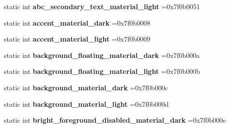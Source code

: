 \begin{DoxyCompactItemize}
static int {\bfseries abc\+\_\+secondary\+\_\+text\+\_\+material\+\_\+light} =0x7f0b0051
\item 
\mbox{\label{classandroid_1_1support_1_1v7_1_1appcompat_1_1R_1_1color_adf9b9dea6fef73b8a1e6ba8df1009171}} 
static int {\bfseries accent\+\_\+material\+\_\+dark} =0x7f0b0008
\item 
\mbox{\label{classandroid_1_1support_1_1v7_1_1appcompat_1_1R_1_1color_a1966f744bfb56259ff2369990a6a06a3}} 
static int {\bfseries accent\+\_\+material\+\_\+light} =0x7f0b0009
\item 
\mbox{\label{classandroid_1_1support_1_1v7_1_1appcompat_1_1R_1_1color_a524c7fb56e9a9e4894f16dafce4544b8}} 
static int {\bfseries background\+\_\+floating\+\_\+material\+\_\+dark} =0x7f0b000a
\item 
\mbox{\label{classandroid_1_1support_1_1v7_1_1appcompat_1_1R_1_1color_a2532ea54ab3e917e635f38483c486048}} 
static int {\bfseries background\+\_\+floating\+\_\+material\+\_\+light} =0x7f0b000b
\item 
\mbox{\label{classandroid_1_1support_1_1v7_1_1appcompat_1_1R_1_1color_ad066556b501230fc00622d9535a924ed}} 
static int {\bfseries background\+\_\+material\+\_\+dark} =0x7f0b000c
\item 
\mbox{\label{classandroid_1_1support_1_1v7_1_1appcompat_1_1R_1_1color_a54de1154b2f7cb078e4e551d27766a4c}} 
static int {\bfseries background\+\_\+material\+\_\+light} =0x7f0b000d
\item 
\mbox{\label{classandroid_1_1support_1_1v7_1_1appcompat_1_1R_1_1color_a9d4ad1c269676f70cac78cc628a7896b}} 
static int {\bfseries bright\+\_\+foreground\+\_\+disabled\+\_\+material\+\_\+dark} =0x7f0b000e
\item 
\mbox{\label{classandroid_1_1support_1_1v7_1_1appcompat_1_1R_1_1color_a2fbc439915b62c8273d8069461a01bbb}} 

\end{DoxyCompactItemize}
